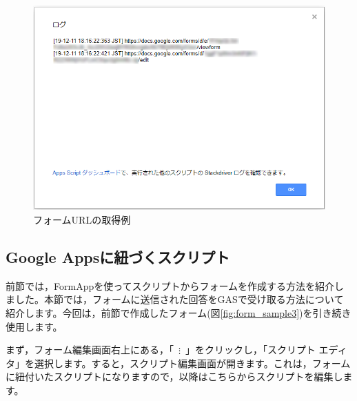 \documentclass[uplatex,a4j]{jsarticle}
\begin{document}
\begin{figure}[H]
 \centering
 \includegraphics[keepaspectratio, scale=0.5]{images/form_sample2.png}
 \caption{フォームURLの取得例}
 \label{fig:form_sample2}
\end{figure}

\subsection{Google Appsに紐づくスクリプト}
\label{subsec:event_object}

前節では，FormAppを使ってスクリプトからフォームを作成する方法を紹介しました。本節では，フォームに送信された回答をGASで受け取る方法について紹介します。今回は，前節で作成したフォーム(図\ref{fig:form_sample3})を引き続き使用します。

まず，フォーム編集画面右上にある，「\ $\mathbf{\vdots}$\ 」をクリックし，「スクリプト エディタ」を選択します。すると，スクリプト編集画面が開きます。これは，フォームに紐付いたスクリプトになりますので，以降はこちらからスクリプトを編集します。
\end{document}
